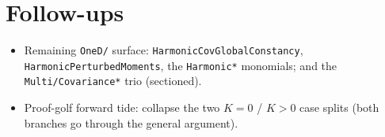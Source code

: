 \documentclass[11pt]{article}
\begin{document}
\section{Follow-ups}
\begin{itemize}[noitemsep]
  \item Remaining \texttt{OneD/} surface: \texttt{HarmonicCovGlobalConstancy},
    \texttt{HarmonicPerturbedMoments}, the \texttt{Harmonic*} monomials; and the
    \texttt{Multi/Covariance*} trio (sectioned).
  \item Proof-golf forward tide: collapse the two $K=0$ / $K>0$ case splits (both branches go
    through the general argument).
\end{itemize}
\end{document}
